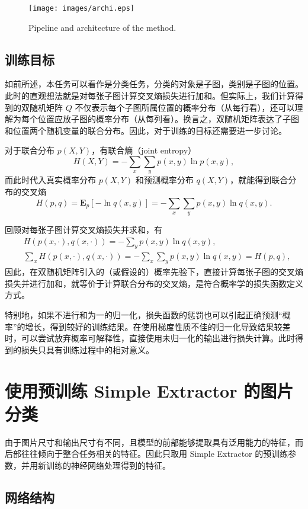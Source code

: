 \documentclass[a4paper]{article}
\begin{document}
\begin{figure}[H]
    \centering
    \texttt{[image: images/archi.eps]}
    \caption{Pipeline and architecture of the method.}
    \label{fig:2}
\end{figure}

\subsection{训练目标}
如前所述，本任务可以看作是分类任务，分类的对象是子图，类别是子图的位置。此时的直观想法就是对每张子图计算交叉熵损失进行加和。但实际上，我们计算得到的双随机矩阵 $Q$ 不仅表示每个子图所属位置的概率分布（从每行看），还可以理解为每个位置应放子图的概率分布（从每列看）。换言之，双随机矩阵表达了子图和位置两个随机变量的联合分布。因此，对于训练的目标还需要进一步讨论。

对于联合分布 $p(X,Y)$，有联合熵（joint entropy）
\[
    H(X,Y) = -\sum_x \sum_y p(x, y) \ln p(x,y),
\]
而此时代入真实概率分布 $p(X,Y)$ 和预测概率分布 $q(X, Y)$，就能得到联合分布的交叉熵
\[
    H(p,q) = \mathbf{E}_p\left[-\ln q(x,y)\right] = -\sum_x \sum_y p(x, y) \ln q(x,y).
\]

回顾对每张子图计算交叉熵损失并求和，有
\[
    \begin{aligned}
        &H(p(x, \cdot), q(x, \cdot)) =  -\sum_y p(x, y) \ln q(x,y),\\
        &\sum_x H(p(x, \cdot), q(x, \cdot)) =  -\sum_x\sum_y p(x, y) \ln q(x,y) = H(p,q),
    \end{aligned}
\]
因此，在双随机矩阵引入的（或假设的）概率先验下，直接计算每张子图的交叉熵损失并进行加和，就等价于计算联合分布的交叉熵，是符合概率学的损失函数定义方式。

特别地，如果不进行和为一的归一化，损失函数的惩罚也可以引起正确预测“概率”的增长，得到较好的训练结果。在使用梯度性质不佳的归一化导致结果较差时，可以尝试放弃概率可解释性，直接使用未归一化的输出进行损失计算。此时得到的损失只具有训练过程中的相对意义。

\section{使用预训练 Simple Extractor 的图片分类}
由于图片尺寸和输出尺寸有不同，且模型的前部能够提取具有泛用能力的特征，而后部往往倾向于整合任务相关的特征。因此只取用 Simple Extractor 的预训练参数，并用新训练的神经网络处理得到的特征。
\subsection{网络结构}
\end{document}
